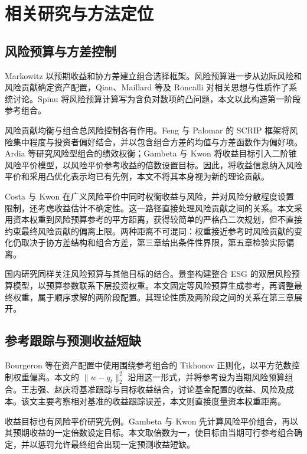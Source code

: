 \section{相关研究与方法定位}
\subsection{风险预算与方差控制}
Markowitz 以预期收益和协方差建立组合选择框架\cite{markowitz1959portfolio}。风险预算进一步从边际风险和风险贡献确定资产配置，Qian、Maillard 等及 Roncalli 对相关思想与性质作了系统讨论\cite{qian2005risk,maillard2010properties,roncalli2013introduction}。Spinu 将风险预算计算写为含负对数项的凸问题\cite{spinu2013algorithm}，本文以此构造第一阶段参考组合。

风险贡献均衡与组合总风险控制各有作用。Feng 与 Palomar 的 SCRIP 框架将风险集中程度与投资者偏好结合，并以包含组合方差的均值与方差函数作为偏好项\cite{feng2015scrip}。Ardia 等研究风险型组合的绩效权衡\cite{ardia2018beyond}；Gambeta 与 Kwon 将收益目标引入二阶锥风险平价模型，以风险平价参考收益的倍数设置目标\cite{gambeta2020risk}。因此，将收益信息纳入风险平价和采用凸优化表示均已有先例，本文不将其本身视为新的理论贡献。

Costa 与 Kwon 在广义风险平价中同时权衡收益与风险，并对风险分散程度设置限制，还考虑收益估计不确定性\cite{costa2020generalized}。这一路径直接处理风险贡献之间的关系。本文采用资本权重到风险预算参考的平方距离，获得较简单的严格凸二次规划，但不直接约束最终风险贡献的偏离上限。两种距离不可混同：权重接近参考时风险贡献的变化仍取决于协方差结构和组合方差，第三章给出条件性界限，第五章检验实际偏离。

国内研究同样关注风险预算与其他目标的结合。景奎构建整合 ESG 的双层风险预算模型，以预算参数联系下层投资权重\cite{jing2026esg}。本文固定等风险预算生成参考，再调整最终权重，属于顺序求解的两阶段配置。其理论性质及两阶段之间的关系在第三章展开。

\subsection{参考跟踪与预测收益短缺}
Bourgeron 等在资产配置中使用围绕参考组合的 Tikhonov 正则化，以平方范数控制权重偏离\cite{bourgeron2018robust}。本文的 $\|w-q_t\|_2^2$ 沿用这一形式，并将参考设为当期风险预算组合。王志强、赵庆将基准跟踪与目标收益结合，讨论基金配置的收益、风险及成本\cite{wang2015tracking}。该文主要考察相对基准的收益跟踪误差，本文则直接度量资本权重距离。

收益目标也有风险平价研究先例。Gambeta 与 Kwon 先计算风险平价组合，再以其预期收益的一定倍数设定目标\cite{gambeta2020risk}。本文取倍数为一，使目标由当期可行参考组合确定，并以惩罚允许最终组合出现一定预测收益短缺。

